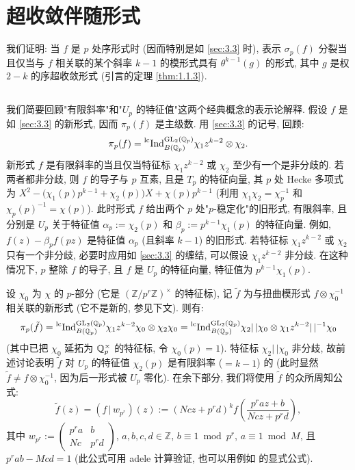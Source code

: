 
\section{超收敛伴随形式}\label{sec:4}

我们证明: 当 $f$ 是 $p$ 处序形式时 (因而特别是如 \ref{sec:3.3} 时), 表示 $\sigma_p(f)$ 分裂当且仅当与 $f$ 相关联的某个斜率 $k-1$ 的模形式具有 $\theta^{k-1}(g)$ 的形式, 其中 $g$ 是权 $2-k$ 的序超收敛形式 (引言的定理 \ref{thm:1.1.3}).

\subsection{\mbox{}}\label{sec:4.1}

我们简要回顾"有限斜率"和"$U_p$ 的特征值"这两个经典概念的表示论解释.
假设 $f$ 是如 \ref{sec:3.3} 的新形式, 因而 $\pi_p(f)$ 是主级数.
用 \ref{sec:3.3} 的记号, 回顾:
\[
\pi_p(f) = \prescript{\mathrm{lc}}{}{\mathrm{Ind}}_{B(\mathbb{Q}_p)}^{\mathrm{GL}_2(\mathbb{Q}_p)} \chi_1z^{k-2} \otimes \chi_2.
\]
新形式 $f$ 是有限斜率的当且仅当特征标 $\chi_1z^{k-2}$ 或 $\chi_2$ 至少有一个是非分歧的.
若两者都非分歧, 则 $f$ 的导子与 $p$ 互素, 且是 $T_p$ 的特征向量, 其 $p$ 处 Hecke 多项式为 $X^{2} - \bigl(\chi_1(p)p^{k-1} + \chi_2(p)\bigr)X + \chi(p)p^{k-1}$ (利用 $\chi_1\chi_2 = \chi_p^{-1}$ 和 $\chi_p(p)^{-1} = \chi(p)$).
此时形式 $f$ 给出两个 $p$ 处"$p$-稳定化"的旧形式, 有限斜率, 且分别是 $U_p$ 关于特征值 $\alpha_p := \chi_2(p)$ 和 $\beta_p := p^{k-1}\chi_1(p)$ 的特征向量.
例如, $f(z) - \beta_p f(pz)$ 是特征值 $\alpha_p$ (且斜率 $k-1$) 的旧形式.
若特征标 $\chi_1z^{k-2}$ 或 $\chi_2$ 只有一个非分歧, 必要时应用如 \ref{sec:3.3} 的缠结, 可以假设 $\chi_1z^{k-2}$ 非分歧.
在这种情况下, $p$ 整除 $f$ 的导子, 且 $f$ 是 $U_p$ 的特征向量, 特征值为 $p^{k-1}\chi_1(p)$.

设 $\chi_0$ 为 $\chi$ 的 $p$-部分 (它是 $(\mathbb{Z}/p^{r}\mathbb{Z})^{\times}$ 的特征标), 记 $\tilde{f}$ 为与扭曲模形式 $f \otimes \chi_0^{-1}$ 相关联的新形式 (它不是新的, 参见下文).
则有:
\[
\pi_p(\tilde{f}) = \prescript{\mathrm{lc}}{}{\mathrm{Ind}}_{B(\mathbb{Q}_p)}^{\mathrm{GL}_2(\mathbb{Q}_p)} \chi_1z^{k-2}\chi_0 \otimes \chi_2\chi_0 = \prescript{\mathrm{lc}}{}{\mathrm{Ind}}_{B(\mathbb{Q}_p)}^{\mathrm{GL}_2(\mathbb{Q}_p)} \chi_2|\,|\chi_0 \otimes \chi_1z^{k-2}|\,|^{-1}\chi_0
\]
(其中已把 $\chi_0$ 延拓为 $\mathbb{Q}_p^{\times}$ 的特征标, 令 $\chi_0(p) = 1$).
特征标 $\chi_2|\,|\chi_0$ 非分歧, 故前述讨论表明 $\tilde{f}$ 对 $U_p$ 的特征值 $\chi_2(p)$ 是有限斜率 ($= k-1$) 的 (此时显然 $\tilde{f} \neq f \otimes \chi_0^{-1}$, 因为后一形式被 $U_p$ 零化).
在余下部分, 我们将使用 $\tilde{f}$ 的众所周知公式:
\[
\tilde{f}(z) = (f\,|\,w_{p^{r}})(z) := (Ncz + p^{r}d)^{k} f\!\left(\frac{p^{r}az + b}{Ncz + p^{r}d}\right),
\]
其中 $w_{p^{r}} := \begin{pmatrix} p^{r}a & b \\ Nc & p^{r}d \end{pmatrix}$, $a,b,c,d \in \mathbb{Z}$, $b \equiv 1 \bmod p^{r}$, $a \equiv 1 \bmod M$, 且 $p^{r}ab - Mcd = 1$ (此公式可用 adele 计算验证, 也可以用例如 \cite[\S6]{ref:30} 的显式公式).

